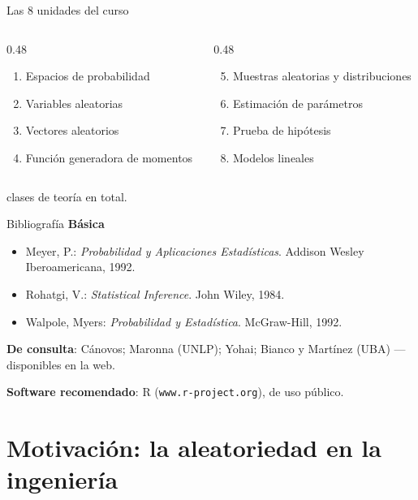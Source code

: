 \documentclass[aspectratio=169,11pt]{beamer}
\begin{document}
\begin{frame}{Las 8 unidades del curso}
\begin{columns}[T]
\begin{column}{0.48\textwidth}
\begin{enumerate}
\item Espacios de probabilidad
\item Variables aleatorias
\item Vectores aleatorios
\item Función generadora de momentos
\end{enumerate}
\end{column}
\begin{column}{0.48\textwidth}
\begin{enumerate}
\setcounter{enumi}{4}
\item Muestras aleatorias y distribuciones
\item Estimación de parámetros
\item Prueba de hipótesis
\item Modelos lineales
\end{enumerate}
\end{column}
\end{columns}

\vspace{0.8em}
 clases de teoría en total.
\end{frame}

\begin{frame}{Bibliografía}
\textbf{Básica}
\begin{itemize}\small
\item Meyer, P.: \emph{Probabilidad y Aplicaciones Estadísticas}. Addison Wesley Iberoamericana, 1992.
\item Rohatgi, V.: \emph{Statistical Inference}. John Wiley, 1984.
\item Walpole, Myers: \emph{Probabilidad y Estadística}. McGraw-Hill, 1992.
\end{itemize}

\textbf{De consulta}: Cánovos; Maronna (UNLP); Yohai; Bianco y Martínez (UBA) — disponibles en la web.

\vspace{0.4em}
\textbf{Software recomendado}: R (\texttt{www.r-project.org}), de uso público.
\end{frame}

\section{Motivación: la aleatoriedad en la ingeniería}
\end{document}
